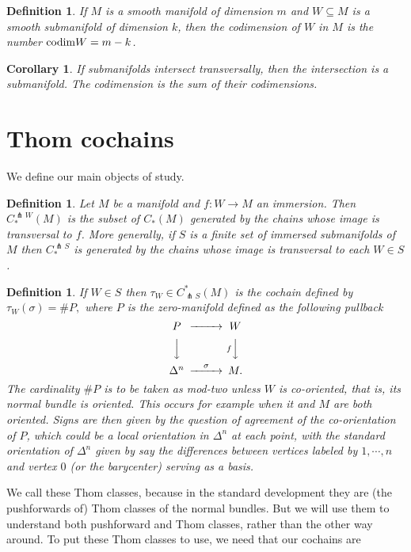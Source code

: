 \documentclass{amsart}          %
\newtheorem{corollary}[theorem]{Corollary}
\newtheorem{definition}[theorem]{Definition}
\newcommand{\codim}{{\rm codim}}
\begin{document}
\begin{definition}
If $M$ is a smooth manifold of dimension $m$ and $W\subseteq M$ is a smooth submanifold of dimension $k$, then the codimension of $W$ in $M$ is the number $\codim W=m-k$.
\end{definition}

\begin{corollary}
If submanifolds intersect transversally, then the intersection is a submanifold.  The codimension is the sum of their codimensions.
\end{corollary}

\section{Thom cochains}

We  define our main objects of study.

\begin{definition}
Let $M$ be a manifold and $f : W \to M$ an immersion. Then $C^{\pitchfork W}_{*}(M)$ is the subset of $C_{*}(M)$ generated by the chains whose image is transversal to $f$. More generally, if $S$ is a  finite set of immersed submanifolds of $M$ then $C^{\pitchfork S}_{*}$ is generated by the chains whose image is transversal to each $W \in S$.
\end{definition}

\begin{definition}
If $W \in S$ then $\tau_{W} \in C^{*}_{\pitchfork S}(M)$ is the cochain defined by $\tau_W (\sigma) = \# P,$  where $P$ is
the  zero-manifold defined as the following pullback
$$
\begin{CD}
P @>>> W\\
@VVV  @VfVV\\
\Delta^n @>\sigma>> M.
\end{CD}
$$
The cardinality $\# P$ is to be taken as mod-two unless $W$  is co-oriented, that is, its normal bundle is oriented.  This occurs
for example when it and $M$ are both oriented.  Signs are then given by the question of agreement of the co-orientation of $P$, 
which could be a local orientation in $\Delta^n$ at each point, with the standard orientation of $\Delta^n$ given by say the differences between vertices labeled by $1, \cdots, n$ and vertex $0$ (or the barycenter) serving as a basis.
\end{definition}

We call these Thom classes, because in the standard development they are (the pushforwards of)  Thom classes of the normal bundles.  But we will use 
them to understand both pushforward and Thom classes, rather than the other way around.  To put these Thom classes to use, 
we need that our cochains are 
\end{document}
